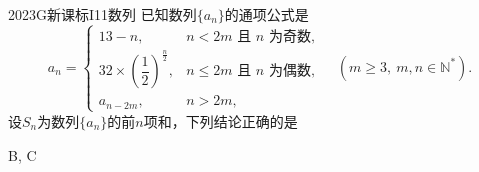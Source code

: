 
\begin{problem}{2023}{G}{新课标I}{11}{数列}
已知数列$\{a_n\}$的通项公式是
\[
a_n=
\begin{cases}
13-n, & n<2m\text{ 且 }n\text{ 为奇数},\\[1em]
32\times\left(\dfrac{1}{2}\right)^{\frac{n}{2}}, & n\leq 2m\text{ 且 }n\text{ 为偶数},\\[1em]
a_{n-2m}, & n>2m,
\end{cases}
\quad (m\geq3,\ m,n\in\mathbb{N}^*).
\]
设$S_n$为数列$\{a_n\}$的前$n$项和，下列结论正确的是
\begin{choices}
\end{choices}
\end{problem}

\begin{answer}
B, C
\end{answer}


